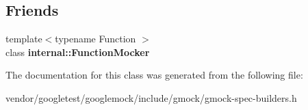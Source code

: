 \subsection*{Friends}
\begin{DoxyCompactItemize}
\item 
\mbox{\label{classtesting_1_1internal_1_1_mock_spec_a6980863fff8693124aff79c507f87d45}} 
{\footnotesize template$<$typename Function $>$ }\\class {\bfseries internal\+::\+Function\+Mocker}
\end{DoxyCompactItemize}


The documentation for this class was generated from the following file\+:\begin{DoxyCompactItemize}
\item 
vendor/googletest/googlemock/include/gmock/gmock-\/spec-\/builders.\+h\end{DoxyCompactItemize}
